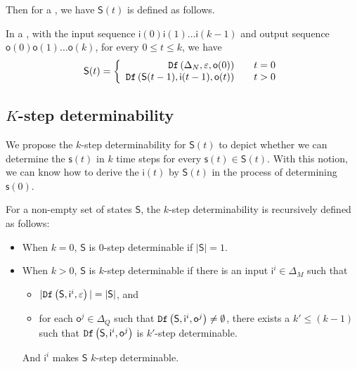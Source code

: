  Then for a \BCN, we have $\mathsf{S}(t)$ is defined as follows.
 \begin{definition}[$\mathsf{S}(t)$] In a \BCN, with the input sequence $\mathsf{i}(0)\mathsf{i}(1)\ldots\mathsf{i}(k-1)$ and output sequence $\mathsf{o}(0)\mathsf{o}(1)\ldots\mathsf{o}(k)$, for every $0\le t\le k$, we have
	\[\mathsf{S}(t)=\left\{
\begin{array}{rcl}
{\tt Df}\left(\Delta_N,\varepsilon,\mathsf{o}(0)\right)      &      & {t=0}\\
{\tt Df}\left(\mathsf{S}(t-1),\mathsf{i}(t-1),\mathsf{o}(t)\right)       &      & {t>0}
\end{array} \right. \]

\end{definition}
 
 
\subsection{$K$-step determinability}
 We propose the $k$-step determinability for $\mathsf{S}(t)$ to depict whether we can determine the $\mathsf{s}(t)$ in $k$ time steps for every $\mathsf{s}(t)\in \mathsf{S}(t)$. With this notion, we can know how to derive the $\mathsf{i}(t)$ by $\mathsf{S}(t)$ in the process of determining $\mathsf{s}(0)$. 
\begin{definition} 
For a non-empty  set of states $\mathsf{S}$, the $k$-step determinability is recursively defined as follows:
 \begin{itemize}
 \item When $k=0$, $\mathsf{S}$ is $0$-step determinable if $|\mathsf{S}|=1$. 
 \item When $k>0$, $\mathsf{S}$ is $k$-step determinable
 if there is an input $\mathsf{i}^{i} \in \Delta_M$ such that
 \begin{itemize}
 \item  $|{\tt Df}\left(\mathsf{S},\mathsf{i}^{i},\varepsilon\right)|=|\mathsf{S}|$, and 
 \item  for each $\mathsf{o}^{j}\in \Delta_Q$ such that ${\tt Df}\left(\mathsf{S},\mathsf{i}^{i},\mathsf{o}^{j}\right)\neq \emptyset$, there exists a ${k'}\le 
(k-1)$ such that ${\tt Df}\left(\mathsf{S},\mathsf{i}^{i},\mathsf{o}^{j}\right)$ is $k'$-step determinable.
 \end{itemize}
 And $\mathsf{i}^{i}$ makes $\mathsf{S}$ $k$-step determinable.
 \end{itemize}
\end{definition}

